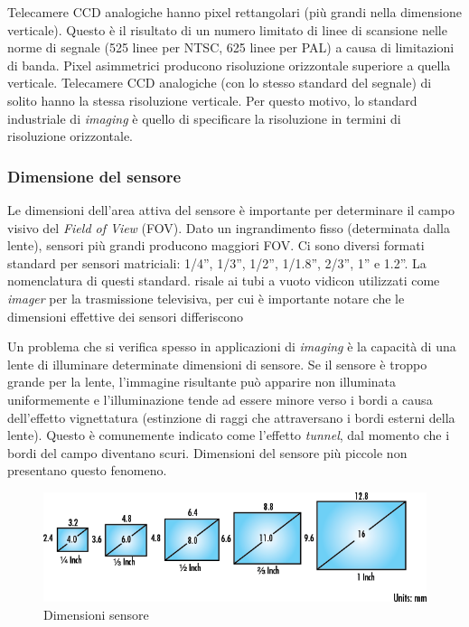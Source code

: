 Telecamere CCD analogiche hanno pixel rettangolari (più grandi nella dimensione verticale). Questo è il risultato di un numero limitato di linee di scansione nelle norme di segnale (525 linee per NTSC, 625 linee per PAL) a causa di limitazioni di banda. Pixel asimmetrici producono risoluzione orizzontale superiore a quella verticale. Telecamere CCD analogiche (con lo stesso standard del segnale) di solito hanno la stessa risoluzione verticale. Per questo motivo, lo standard industriale di \emph{imaging} è quello di specificare la risoluzione in termini di risoluzione orizzontale.

\subsubsection{Dimensione del sensore}

Le dimensioni dell'area attiva del sensore  è importante per determinare il campo visivo del \emph{Field of View} (FOV). 
Dato un ingrandimento fisso (determinata dalla lente), sensori più grandi producono maggiori FOV. Ci sono diversi formati standard per sensori matriciali: 1/4'', 1/3'', 1/2'', 1/1.8'', 2/3'', 1'' e 1.2''. La nomenclatura di questi standard. risale ai tubi a vuoto vidicon utilizzati come \emph{imager} per la trasmissione televisiva, per cui è importante notare che le dimensioni effettive dei sensori differiscono 

Un problema che si verifica spesso in applicazioni di \emph{imaging} è la capacità di una lente di illuminare determinate dimensioni di sensore. Se il sensore è troppo grande per la lente, l'immagine risultante può apparire non illuminata uniformemente e l'illuminazione tende ad essere minore verso i bordi a causa dell'effetto vignettatura (estinzione di raggi che attraversano i bordi esterni della lente). Questo è comunemente indicato come l'effetto \emph{tunnel}, dal momento che i bordi del campo diventano scuri. Dimensioni del sensore più piccole non presentano questo fenomeno.

\begin{figure}[!ht]
\centering
\includegraphics[width=.8\textwidth]{img/dimensione-sensore.png}
\caption{Dimensioni sensore}
\label{fig:dimensioni-sensore}
\end{figure}

